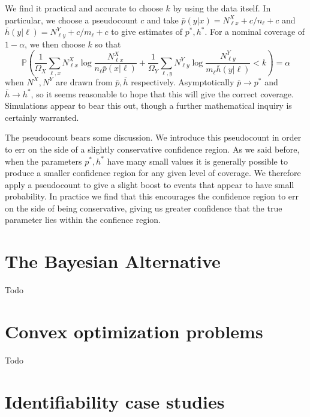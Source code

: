 We find it practical and accurate to choose $k$ by using the data itself.  In particular, we choose a pseudocount $c$ and take $\bar p(y|x)=N^X_{\ell x} +c /n_\ell +c$ and $\bar h(y|\ell)=N^Y_{\ell y} +c / m_\ell +c$ to give estimates of $p^*,h^*$.  For a nominal coverage of $1-\alpha$, we then choose $k$ so that 
\[
\mathbb{P}\left(\frac{1}{\Omega_X}\sum_{\ell,x} N^X_{\ell x} \log \frac{N^X_{\ell x}}{n_\ell \bar p(x|\ell)} + \frac{1}{\Omega_Y}\sum_{\ell,y} N^Y_{\ell y} \log  \frac{N^Y_{\ell y}}{m_\ell \bar h(y|\ell)}<k\right)=\alpha
\]
when $N^X,N^Y$ are drawn from $\bar p,\bar h$ respectively.  Asymptotically $\bar p\rightarrow p^*$ and $\bar h\rightarrow h^*$, so it seems reasonable to hope that this will give the correct coverage.  Simulations appear to bear this out, though a further mathematical inquiry is certainly warranted.    

The pseudocount bears some discussion.  We introduce this pseudocount in order to err on the side of a slightly conservative confidence region.  As we said before, when the parameters $p^*,h^*$ have many small values it is generally possible to produce a smaller confidence region for any given level of coverage.  We therefore apply a pseudocount to give a slight boost to events that appear to have small probability.  In practice we find that this encourages the confidence region to err on the side of being conservative, giving us greater confidence that the true parameter lies within the confience region.

\label{sec:confinterval}

\section{The Bayesian Alternative}

Todo

\label{sec:bayesian}

\section{Convex optimization problems}

\label{sec:optproblems}

Todo

\section{Identifiability case studies}

\label{sec:casestudies}

